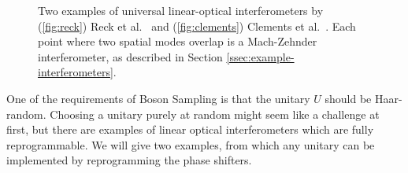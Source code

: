\begin{figure}
\hfill
{}
\caption[Two examples of universal linear-optical interferometers]{\label{fig:universal-lo}Two examples of universal linear-optical interferometers by (\ref{fig:reck}) Reck et al.~\cite{reck1994} and (\ref{fig:clements}) Clements et al.~\cite{clements2016}. Each point where two spatial modes overlap is a Mach-Zehnder interferometer, as described in Section \ref{ssec:example-interferometers}.}
\end{figure}

One of the requirements of Boson Sampling is that the unitary $U$ should be Haar-random. Choosing a unitary purely at random might seem like a challenge at first, but there are examples of linear optical interferometers which are fully reprogrammable. We will give two examples, from which any unitary can be implemented by reprogramming the phase shifters.

